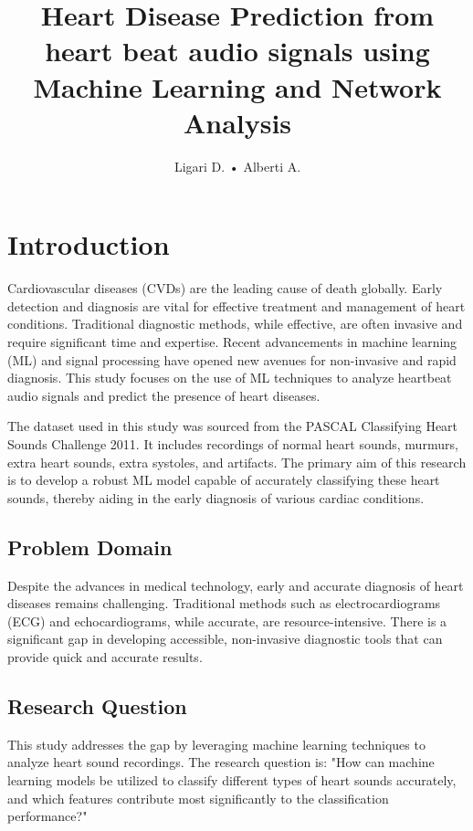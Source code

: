 \documentclass[twocolumn]{class}
\title{Heart Disease Prediction from heart beat audio signals using Machine Learning and Network Analysis}
\author{Ligari D. • Alberti A.  }
\affil[1]{Department of Computer Engineering, Data Science, University of Pavia, Italy \newline\centering Course of Advanced Biomedical Machine Learning}
\begin{document}
\maketitle
\pagestyle{FirstPage}

\tableofcontents




\section{Introduction}
Cardiovascular diseases (CVDs) are the leading cause of death globally. Early detection and diagnosis are vital for effective treatment and management of heart conditions. Traditional diagnostic methods, while effective, are often invasive and require significant time and expertise. Recent advancements in machine learning (ML) and signal processing have opened new avenues for non-invasive and rapid diagnosis. This study focuses on the use of ML techniques to analyze heartbeat audio signals and predict the presence of heart diseases.

The dataset used in this study was sourced from the PASCAL Classifying Heart Sounds Challenge 2011. It includes recordings of normal heart sounds, murmurs, extra heart sounds, extra systoles, and artifacts. The primary aim of this research is to develop a robust ML model capable of accurately classifying these heart sounds, thereby aiding in the early diagnosis of various cardiac conditions.

\subsection{Problem Domain}
Despite the advances in medical technology, early and accurate diagnosis of heart diseases remains challenging. Traditional methods such as electrocardiograms (ECG) and echocardiograms, while accurate, are resource-intensive. There is a significant gap in developing accessible, non-invasive diagnostic tools that can provide quick and accurate results.

\subsection{Research Question}
This study addresses the gap by leveraging machine learning techniques to analyze heart sound recordings. The research question is: "How can machine learning models be utilized to classify different types of heart sounds accurately, and which features contribute most significantly to the classification performance?"
\end{document}
